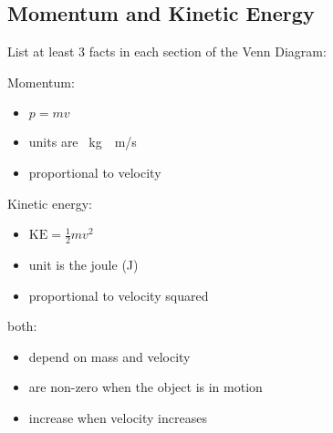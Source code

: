 \documentclass[answers]{exam}
\begin{document}
\begin{questions}
\clearpage
\begin{EnvUplevel}
    \subsection{Momentum and Kinetic Energy}
\end{EnvUplevel}

\question %
List at least 3 facts in each section of the Venn Diagram:

\begin{center}
\end{center}

\begin{solution}
\phantom{.}

Momentum:

\begin{itemize}[itemsep=0pt,topsep=0pt]
    \item $p=mv$
    \item units are \SI{}{kg\cdot m/s}
    \item proportional to velocity
\end{itemize}

\bigskip

Kinetic energy:

\begin{itemize}[itemsep=0pt,topsep=0pt]
    \item $\mathrm{KE} = \frac{1}{2} mv^2$
    \item unit is the joule (J) 
    \item proportional to velocity squared
\end{itemize}

\bigskip

both:

\begin{itemize}[itemsep=0pt,topsep=0pt]
    \item depend on mass and velocity
    \item are non-zero when the object is in motion
    \item increase when velocity increases
\end{itemize}
\end{solution}




\end{questions}
\end{document}
